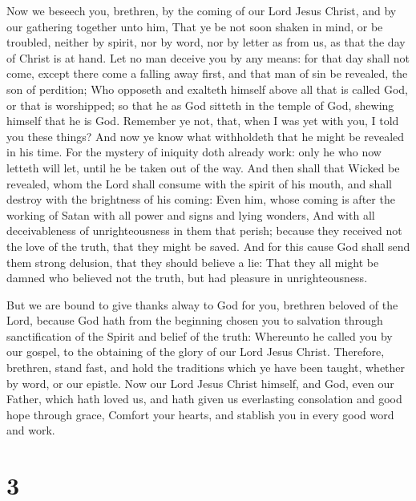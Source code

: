  Now we beseech you, brethren, by the coming of our Lord
Jesus Christ, and by our gathering together unto him, 
That ye be not soon shaken in mind, or be troubled, neither by spirit,
nor by word, nor by letter as from us, as that the day of Christ is at
hand.  Let no man deceive you by any means: for that day
shall not come, except there come a falling away first, and that man of
sin be revealed, the son of perdition;  Who opposeth and
exalteth himself above all that is called God, or that is worshipped; so
that he as God sitteth in the temple of God, shewing himself that he is
God.  Remember ye not, that, when I was yet with you, I
told you these things?  And now ye know what withholdeth
that he might be revealed in his time.  For the mystery of
iniquity doth already work: only he who now letteth will let, until he
be taken out of the way.  And then shall that Wicked be
revealed, whom the Lord shall consume with the spirit of his mouth, and
shall destroy with the brightness of his coming:  Even
him, whose coming is after the working of Satan with all power and signs
and lying wonders,  And with all deceivableness of
unrighteousness in them that perish; because they received not the love
of the truth, that they might be saved.  And for this
cause God shall send them strong delusion, that they should believe a
lie:  That they all might be damned who believed not the
truth, but had pleasure in unrighteousness.

 But we are bound to give thanks alway to God for you,
brethren beloved of the Lord, because God hath from the beginning chosen
you to salvation through sanctification of the Spirit and belief of the
truth:  Whereunto he called you by our gospel, to the
obtaining of the glory of our Lord Jesus Christ. 
Therefore, brethren, stand fast, and hold the traditions which ye have
been taught, whether by word, or our epistle.  Now our
Lord Jesus Christ himself, and God, even our Father, which hath loved
us, and hath given us everlasting consolation and good hope through
grace,  Comfort your hearts, and stablish you in every
good word and work.

\hypertarget{section-2}{%
\section{3}\label{section-2}}

